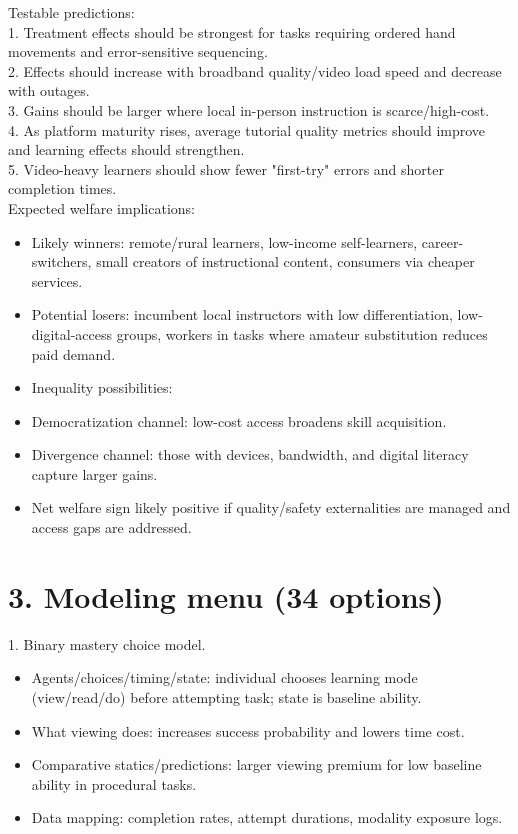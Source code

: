 \documentclass[11pt]{article}
\begin{document}
Testable predictions:\\
1. Treatment effects should be strongest for tasks requiring ordered hand movements and error-sensitive sequencing.\\
2. Effects should increase with broadband quality/video load speed and decrease with outages.\\
3. Gains should be larger where local in-person instruction is scarce/high-cost.\\
4. As platform maturity rises, average tutorial quality metrics should improve and learning effects should strengthen.\\
5. Video-heavy learners should show fewer "first-try" errors and shorter completion times.\\

Expected welfare implications:\\
\begin{itemize}
\item Likely winners: remote/rural learners, low-income self-learners, career-switchers, small creators of instructional content, consumers via cheaper services.
\item Potential losers: incumbent local instructors with low differentiation, low-digital-access groups, workers in tasks where amateur substitution reduces paid demand.
\item Inequality possibilities:
\item Democratization channel: low-cost access broadens skill acquisition.
\item Divergence channel: those with devices, bandwidth, and digital literacy capture larger gains.
\item Net welfare sign likely positive if quality/safety externalities are managed and access gaps are addressed.
\end{itemize}

\section*{3. Modeling menu (34 options)}
1. Binary mastery choice model.\\
\begin{itemize}
\item Agents/choices/timing/state: individual chooses learning mode (view/read/do) before attempting task; state is baseline ability.
\item What viewing does: increases success probability and lowers time cost.
\item Comparative statics/predictions: larger viewing premium for low baseline ability in procedural tasks.
\item Data mapping: completion rates, attempt durations, modality exposure logs.
\end{itemize}
\end{document}
